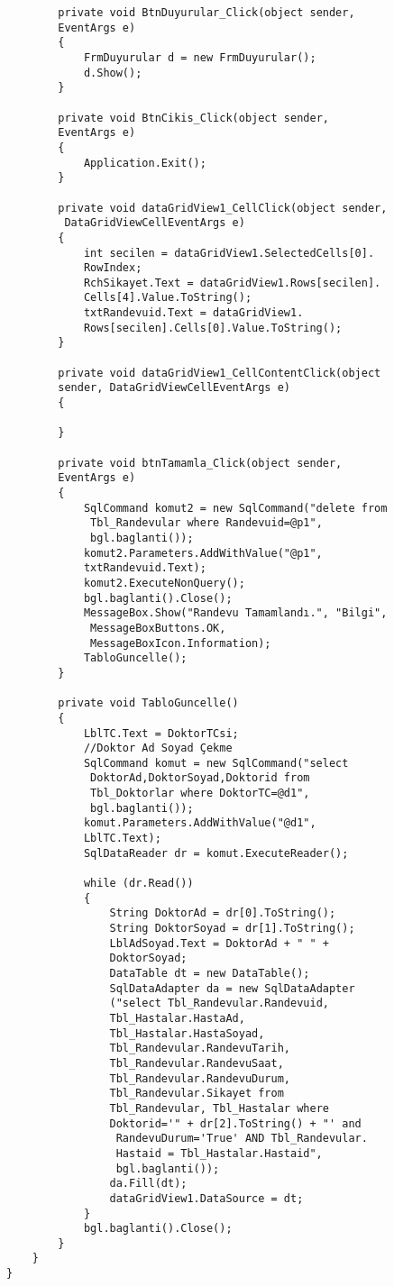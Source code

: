 \begin{lstlisting}
        private void BtnDuyurular_Click(object sender, 
        EventArgs e)
        {
            FrmDuyurular d = new FrmDuyurular();
            d.Show();
        }

        private void BtnCikis_Click(object sender, 
        EventArgs e)
        {
            Application.Exit();
        }

        private void dataGridView1_CellClick(object sender,
         DataGridViewCellEventArgs e)
        {
            int secilen = dataGridView1.SelectedCells[0].
            RowIndex;
            RchSikayet.Text = dataGridView1.Rows[secilen].
            Cells[4].Value.ToString();
            txtRandevuid.Text = dataGridView1.
            Rows[secilen].Cells[0].Value.ToString();
        }

        private void dataGridView1_CellContentClick(object 
        sender, DataGridViewCellEventArgs e)
        {

        }

        private void btnTamamla_Click(object sender, 
        EventArgs e)
        {
            SqlCommand komut2 = new SqlCommand("delete from
             Tbl_Randevular where Randevuid=@p1", 
             bgl.baglanti());
            komut2.Parameters.AddWithValue("@p1", 
            txtRandevuid.Text);
            komut2.ExecuteNonQuery();
            bgl.baglanti().Close();
            MessageBox.Show("Randevu Tamamlandı.", "Bilgi",
             MessageBoxButtons.OK, 
             MessageBoxIcon.Information);
            TabloGuncelle();
        }

        private void TabloGuncelle()
        {
            LblTC.Text = DoktorTCsi;
            //Doktor Ad Soyad Çekme
            SqlCommand komut = new SqlCommand("select
             DoktorAd,DoktorSoyad,Doktorid from 
             Tbl_Doktorlar where DoktorTC=@d1", 
             bgl.baglanti());
            komut.Parameters.AddWithValue("@d1", 
            LblTC.Text);
            SqlDataReader dr = komut.ExecuteReader();

            while (dr.Read())
            {
                String DoktorAd = dr[0].ToString();
                String DoktorSoyad = dr[1].ToString();
                LblAdSoyad.Text = DoktorAd + " " + 
                DoktorSoyad;
                DataTable dt = new DataTable();
                SqlDataAdapter da = new SqlDataAdapter
                ("select Tbl_Randevular.Randevuid, 
                Tbl_Hastalar.HastaAd, 
                Tbl_Hastalar.HastaSoyad, 
                Tbl_Randevular.RandevuTarih, 
                Tbl_Randevular.RandevuSaat, 
                Tbl_Randevular.RandevuDurum, 
                Tbl_Randevular.Sikayet from 
                Tbl_Randevular, Tbl_Hastalar where 
                Doktorid='" + dr[2].ToString() + "' and
                 RandevuDurum='True' AND Tbl_Randevular.
                 Hastaid = Tbl_Hastalar.Hastaid", 
                 bgl.baglanti());
                da.Fill(dt);
                dataGridView1.DataSource = dt;
            }
            bgl.baglanti().Close();
        }
    }
}
\end{lstlisting}

